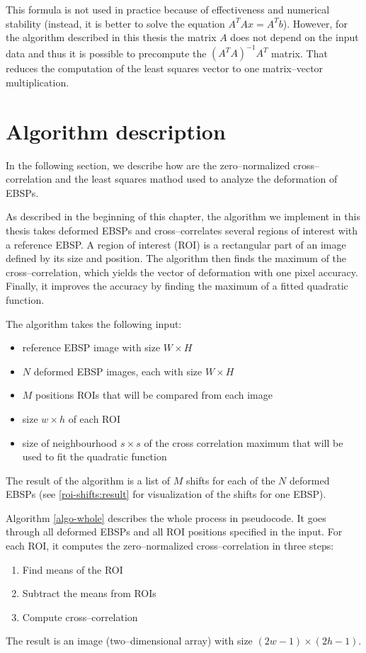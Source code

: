 This formula is not used in practice because of effectiveness and numerical stability (instead, it is better to solve the equation $A^TAx = A^Tb$). However, for the algorithm described in this thesis the matrix $A$ does not depend on the input data and thus it is possible to precompute the $(A^TA)^{-1}A^T$ matrix. That reduces the computation of the least squares vector to one matrix--vector multiplication.


\section{Algorithm description}

In the following section, we describe how are the zero--normalized cross--corre\-lation and the least squares mathod used to analyze the deformation of EBSPs.

As described in the beginning of this chapter, the algorithm we implement in this thesis takes deformed EBSPs and cross--correlates several regions of interest with a reference EBSP. A region of interest (ROI) is a rectangular part of an image defined by its size and position. The algorithm then finds the maximum of the cross--correlation, which yields the vector of deformation with one pixel accuracy. Finally, it improves the accuracy by finding the maximum of a fitted quadratic function.

The algorithm takes the following input:
\begin{itemize}
	\item reference EBSP image with size $W \times H$
	\item $N$ deformed EBSP images, each with size $W \times H$
	\item $M$ positions ROIs that will be compared from each image
	\item size $w \times h$ of each ROI
	\item size of neighbourhood $s \times s$ of the cross correlation maximum that will be used to fit the quadratic function
\end{itemize}
The result of the algorithm is a list of $M$ shifts for each of the $N$ deformed EBSPs (see \cref{roi-shifts:result} for visualization of the shifts for one EBSP).

Algorithm \ref{algo-whole} describes the whole process in pseudocode. It goes through all deformed EBSPs and all ROI positions specified in the input. For each ROI, it computes the zero--normalized cross--corre\-lation in three steps:
\begin{enumerate}
	\item Find means of the ROI
	\item Subtract the means from ROIs
	\item Compute cross--correlation
\end{enumerate}
The result is an image (two--dimensional array) with size $(2w-1) \times (2h-1)$.

